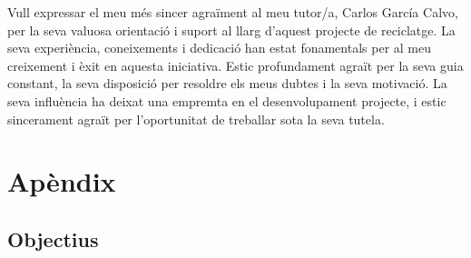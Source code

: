 ﻿\documentclass[10pt,a4paper,twocolumn,twoside]{article}
\begin{document}
Vull expressar el meu més sincer agraïment al meu tutor/a, Carlos García Calvo,  per la seva valuosa orientació i suport al llarg d'aquest projecte de reciclatge. La seva experiència, coneixements i dedicació han estat fonamentals per al meu creixement i èxit en aquesta iniciativa. Estic profundament agraït per la seva guia constant, la seva disposició per resoldre els meus dubtes i la seva motivació. La seva influència ha deixat una empremta en el desenvolupament projecte, i estic sincerament agraït per l'oportunitat de treballar sota la seva tutela.







\clearpage 
\appendix

\section*{Apèndix}

\setcounter{section}{1}

\subsection{Objectius}
\end{document}
